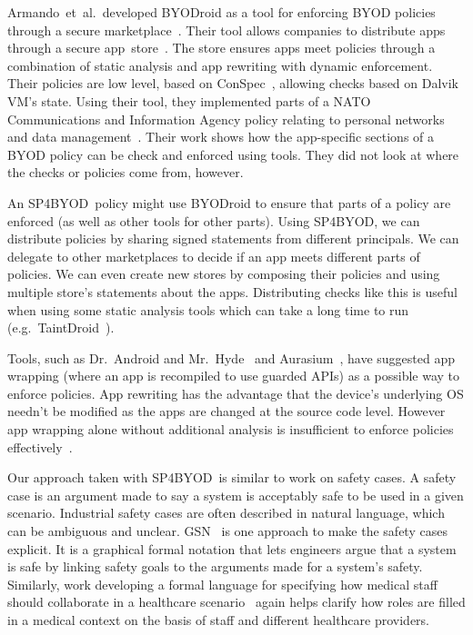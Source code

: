 \documentclass{llncs}
\makeatletter
\newcommand{\etal}{et~al.\@}
\newcommand{\AppPAL}[0]{SP4BYOD}
\makeatother
\begin{document}
Armando~\etal~developed BYODroid as a tool for enforcing BYOD policies through a secure marketplace~\cite{armando_bring_2013}.
Their tool allows companies to distribute apps through a secure app~store~\cite{armando_enabling_2014}.
The store ensures apps meet policies through a combination of static analysis and app rewriting with dynamic enforcement.
Their policies are low level, based on ConSpec~\cite{aktug_conspec_2008}, allowing checks based on Dalvik VM's state.
Using their tool, they implemented parts of a NATO Communications and Information Agency policy relating to personal networks and data management~\cite{armando_developing_2016}.
Their work shows how the app-specific sections of a BYOD policy can be check and enforced using tools.
They did not look at where the checks or policies come from, however.

An \AppPAL~policy might use BYODroid to ensure that parts of a policy are enforced (as well as other tools for other parts).
Using \AppPAL, we can distribute policies by sharing signed statements from different principals.
We can delegate to other marketplaces to decide if an app meets different parts of policies.
We can even create new stores by composing their policies and using multiple store's statements about the apps.
Distributing checks like this is useful when using some static analysis tools which can take a long time to run (e.g.~TaintDroid~\cite{enck_taintdroid:_2014}).

Tools, such as Dr.~Android and Mr.~Hyde~\cite{jeon_dr._2012} and Aurasium~\cite{xu_aurasium:_2012}, have suggested app wrapping (where an app is recompiled to use guarded APIs) as a possible way to enforce policies.
App rewriting has the advantage that the device's underlying OS needn't be modified as the apps are changed at the source code level.
However app wrapping alone without additional analysis is insufficient to enforce policies effectively~\cite{hao_effectiveness_2013}.

Our approach taken with \AppPAL~is similar to work on safety cases.
A safety case is an argument made to say a system is acceptably safe to be used in a given scenario.
Industrial safety cases are often described in natural language, which can be ambiguous and unclear.
\ac{GSN}~\cite{kelly_goal_2004} is one approach to make the safety cases explicit.
It is a graphical formal notation that lets engineers argue that a system is safe by linking safety goals to the arguments made for a system's safety.
Similarly, work developing a formal language for specifying how medical staff should collaborate in a healthcare scenario~\cite{papapanagiotou_formal_2014} again helps clarify how roles are filled in a medical context on the basis of staff and different healthcare providers.
\end{document}
